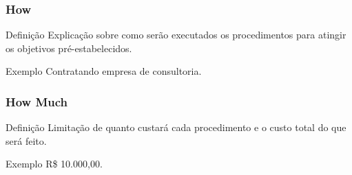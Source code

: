 \documentclass[aspectratio=169]{beamer}
\begin{document}
\begin{frame}
	\frametitle{How}

	\begin{block}{Defini\c cão}
		 Explicação sobre como serão executados os procedimentos para atingir os objetivos pré-estabelecidos.
	\end{block}\vfill
	
	\begin{exampleblock}{Exemplo}
		Contratando empresa de consultoria.
	\end{exampleblock}
\end{frame}

\begin{frame}
	\frametitle{How Much}

	\begin{block}{Defini\c cão}
		 Limitação de quanto custará cada procedimento e o custo total do que será feito.
	\end{block}\vfill
	
	\begin{exampleblock}{Exemplo}
		R\$ 10.000,00.
	\end{exampleblock}
\end{frame}
\end{document}
